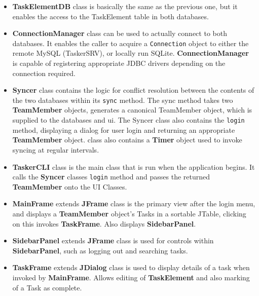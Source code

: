 \documentclass{project}
\begin{document}
\begin{itemize}
  		\item \textbf{TaskElementDB} class is basically the same as the previous one, but it enables the access to the TaskElement table in both databases.
  		\item \textbf{ConnectionManager} class can be used to actually connect to both databases. It enables the caller to acquire a \texttt{Connection} object to either the remote MySQL (TaskerSRV), or locally run SQLite. \textbf{ConnectionManager} is capable of registering appropriate JDBC drivers depending on the connection required. 
        \item \textbf{Syncer} class contains the logic for conflict resolution between the contents of the two databases within its \texttt{sync} method. The sync method takes two \textbf{TeamMember} objects, generates a canonical TeamMember object, which is supplied to the databases and ui. The Syncer class also contains the \texttt{login} method, displaying a dialog for user login and returning an appropriate \textbf{TeamMember} object.
        class also contains a \textbf{Timer} object used to invoke syncing at regular intervals.
        \item \textbf{TaskerCLI} class is the main class that is run when the application begins. It calls the \textbf{Syncer} classes \texttt{login} method and passes the returned \textbf{TeamMember} onto the UI Classes.
        \item \textbf{MainFrame} extends \textbf{JFrame} class is the primary view after the login menu, and displays a \textbf{TeamMember} object's Tasks in a sortable JTable, clicking on this invokes \textbf{TaskFrame}. Also displays \textbf{SidebarPanel}.
        \item \textbf{SidebarPanel} extends \textbf{JFrame} class is used for controls within \textbf{SidebarPanel}, such as logging out and searching tasks.
        \item \textbf{TaskFrame} extends \textbf{JDialog} class is used to display details of a task when invoked by \textbf{MainFrame}. Allows editing of \textbf{TaskElement} and also marking of a Task as complete.
  \end{itemize}
\end{document}

